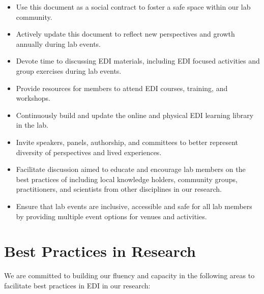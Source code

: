 \documentclass[
]{book}
\providecommand{\tightlist}{%
  \setlength{\itemsep}{0pt}\setlength{\parskip}{0pt}}
\begin{document}
\begin{itemize}
\tightlist
\item
  Use this document as a social contract to foster a safe space within our lab community.
\item
  Actively update this document to reflect new perspectives and growth annually during lab events.
\item
  Devote time to discussing EDI materials, including EDI focused activities and group exercises during lab events.
\item
  Provide resources for members to attend EDI courses, training, and workshops.
\item
  Continuously build and update the online and physical EDI learning library in the lab.
\item
  Invite speakers, panels, authorship, and committees to better represent diversity of perspectives and lived experiences.
\item
  Facilitate discussion aimed to educate and encourage lab members on the best practices of including local knowledge holders, community groups, practitioners, and scientists from other disciplines in our research.
\item
  Ensure that lab events are inclusive, accessible and safe for all lab members by providing multiple event options for venues and activities.
\end{itemize}

\hypertarget{researchpractices}{%
\section*{Best Practices in Research}\label{researchpractices}}

We are committed to building our fluency and capacity in the following areas to facilitate best practices in EDI in our research:
\end{document}
